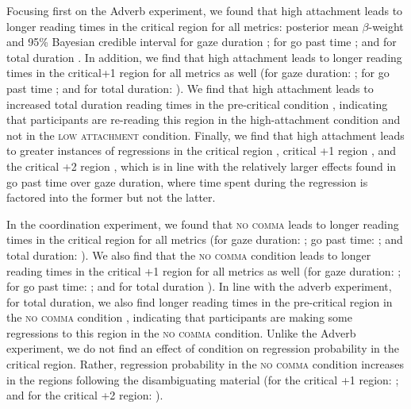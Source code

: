 \documentclass[12pt]{article}
\newcommand{\nocomma}{\textsc{no comma}\xspace}
\newcommand{\lowattach}{\textsc{low attachment}\xspace}
\begin{document}
{Focusing first on the Adverb experiment, we found that high attachment leads to longer reading times in the critical region for all metrics: posterior mean $\beta$-weight and 95\% Bayesian credible interval for gaze duration ; for go past time ; and for total duration . In addition, we find that high attachment leads to longer reading times in the critical+1 region for all metrics as well (for gaze duration: ; for go past time ; and for total duration: ). We find that high attachment leads to increased total duration reading times in the pre-critical condition , indicating that participants are re-reading this region in the high-attachment condition and not in the \lowattach condition. Finally, we find that high attachment leads to greater instances of regressions in the critical region , critical +1 region , and the critical +2 region , which is in line with the relatively larger effects found in go past time over gaze duration, where time spent during the regression is factored into the former but not the latter. 


In the coordination experiment, we found that \nocomma leads to longer reading times in the critical region for all metrics (for gaze duration: ; go past time: ; and total duration: ). We also find that the \nocomma condition leads to longer reading times in the critical +1 region for all metrics as well (for gaze duration: ; for go past time: ; and for total duration ). In line with the adverb experiment, for total duration, we also find longer reading times in the pre-critical region in the \nocomma condition , indicating that participants are making some regressions to this region in the \nocomma condition. Unlike the Adverb experiment, we do not find an effect of condition on regression probability in the critical region. Rather, regression probability in the \nocomma condition increases in the regions following the disambiguating material (for the critical +1 region: ; and for the critical +2 region: ).

}
\end{document}

